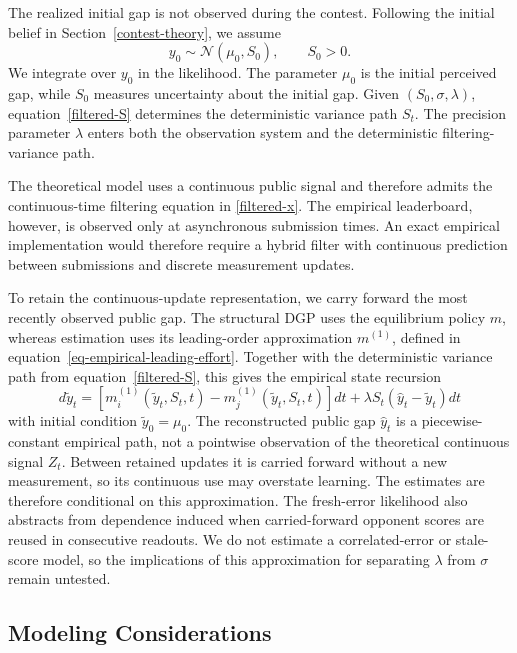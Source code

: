 \documentclass[mnsc]{informs3}
\begin{document}
{The realized initial gap is not observed during the contest. Following the initial belief in Section~\ref{contest-theory}, we assume}
\begin{equation}\label{eq-empirical-initial-state}
{y_0\sim\mathcal N\!\left(\mu_0,S_0\right),
\qquad S_0>0.}
\end{equation}
{We integrate over $y_0$ in the likelihood. The parameter $\mu_0$ is the initial perceived gap, while $S_0$ measures uncertainty about the initial gap. Given $(S_0,\sigma,\lambda)$, equation~\eqref{filtered-S} determines the deterministic variance path $S_t$.}
{The precision parameter $\lambda$ enters both the observation system and the deterministic filtering-variance path.}

The theoretical model uses a continuous public signal and therefore admits the continuous-time filtering equation in \eqref{filtered-x}. The empirical leaderboard, however, is observed only at asynchronous submission times. An exact empirical implementation would therefore require a hybrid filter with continuous prediction between submissions and discrete measurement updates.

{To retain the continuous-update representation, we carry forward the most recently observed public gap. The structural DGP uses the equilibrium policy $m$, whereas estimation uses its leading-order approximation $m^{(1)}$, defined in equation~\eqref{eq-empirical-leading-effort}. Together with the deterministic variance path from equation~\eqref{filtered-S}, this gives the empirical state recursion}
\begin{equation}\label{eq-filtered-y-update}
{d\tilde{y}_{t} = \left[m_i^{(1)}(\tilde{y}_t,S_t,t) - m_j^{(1)}(\tilde{y}_t,S_t,t)\right]dt + \lambda S_t(\hat{y}_t-\tilde{y}_{t}) dt}
\end{equation}
with initial condition $\tilde{y}_0 = \mu_0$.
The reconstructed public gap $\hat y_t$ is a piecewise-constant empirical path, not a pointwise observation of the theoretical continuous signal $Z_t$. Between retained updates it is carried forward without a new measurement, so its continuous use may overstate learning. The estimates are therefore conditional on this approximation.
The fresh-error likelihood also abstracts from dependence induced when carried-forward opponent scores are reused in consecutive readouts. We do not estimate a correlated-error or stale-score model, so the implications of this approximation for separating $\lambda$ from $\sigma$ remain untested.

\subsection{Modeling Considerations}\label{sect-concerns}
\end{document}
